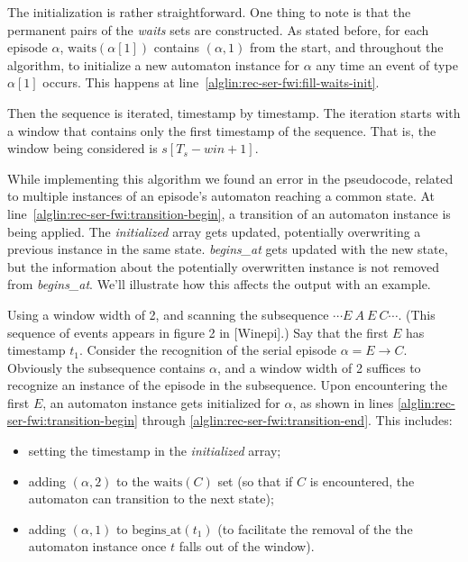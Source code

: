 The initialization is rather straightforward. One thing to note is that the permanent pairs of the \emph{waits} sets are constructed. As stated before, for each episode $ \alpha $, $ \text{waits}(\alpha[1]) $ contains $ (\alpha, 1) $ from the start, and throughout the algorithm, to initialize a new automaton instance for $ \alpha $ any time an event of type $ \alpha[1] $ occurs. This happens at line~\ref{alglin:rec-ser-fwi:fill-waits-init}.

Then the sequence is iterated, timestamp by timestamp. The iteration starts with a window that contains only the first timestamp of the sequence. That is, the window being considered is $ s[T_s - win + 1] $.

While implementing this algorithm we found an error in the pseudocode, related to multiple instances of an episode's automaton reaching a common state. At line~\ref{alglin:rec-ser-fwi:transition-begin}, a transition of an automaton instance is being applied. The \emph{initialized} array gets updated, potentially overwriting a previous instance in the same state. \emph{begins\_at} gets updated with the new state, but the information about the potentially overwritten instance is not removed from \emph{begins\_at}. We'll illustrate how this affects the output with an example.

Using a window width of 2, and scanning the subsequence $ \cdots E \: A \: E \: C \cdots $. (This sequence of events appears in figure 2 in [Winepi].) Say that the first $ E $ has timestamp $ t_1 $. Consider the recognition of the serial episode $ \alpha = E \to C $. Obviously the subsequence contains $ \alpha $, and a window width of 2 suffices to recognize an instance of the episode in the subsequence. Upon encountering the first $ E $, an automaton instance gets initialized for $ \alpha $, as shown in lines \ref{alglin:rec-ser-fwi:transition-begin} through \ref{alglin:rec-ser-fwi:transition-end}. This includes:
\begin{itemize}
\item setting the timestamp in the \emph{initialized} array;
\item adding $ (\alpha, 2) $ to the $ \text{waits}(C) $ set (so that if $ C $ is encountered, the automaton can transition to the next state);
\item adding $ (\alpha, 1) $ to $ \text{begins\_at}(t_1) $ (to facilitate the removal of the the automaton instance once $ t $ falls out of the window).
\end{itemize}

